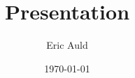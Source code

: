 \documentclass{beamer}
\title[presentationTemplate]{Presentation}
\author{Eric Auld}
\date{\today}
\begin{document}
\begin{frame}
  \titlepage
\end{frame}

\begin{frame}
\begin{itemize}
 \end{itemize}
\end{frame}











\end{document}
